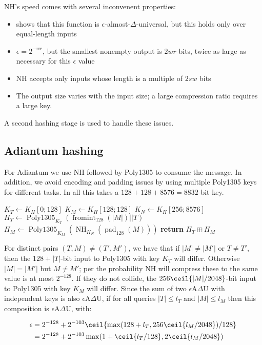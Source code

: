 \documentclass[journal=tosc,preprint,floatrow,submission]{iacrtrans}
\DeclareMathOperator{\Polydjb}{Poly1305}
\DeclareMathOperator{\NH}{NH}
\DeclareMathOperator{\fromint}{fromint}
\DeclareMathOperator{\pad}{pad}
\begin{document}
NH's speed comes with several inconvenent properties:
\begin{itemize}
    \item \cite{nh} shows that this function is $\epsilon$-almost-$\Delta$-universal, but this
        holds only over equal-length inputs
    \item $\epsilon = 2^{-wr}$, but the smallest nonempty output is $2wr$ bits, twice as large
        as necessary for this $\epsilon$ value
    \item NH accepts only inputs whose length is a multiple of $2sw$ bits
    \item The output size varies with the input size; a large compression ratio requires a large key.
\end{itemize}
A second hashing stage is used to handle these issues.

\subsection{Adiantum hashing}

For Adiantum we use NH followed by Poly1305 to consume the message. In addition, we avoid
encoding and padding issues by using multiple Poly1305 keys for different tasks.
In all this takes a $128 + 128 + 8576 = 8832$-bit key.

\begin{algorithmic}[0]
    \State $K_T \gets K_H[0;128]$
    \State $K_M \gets K_H[128;128]$
    \State $K_N \gets K_H[256;8576]$
    \State $H_T \gets \Polydjb_{K_T}(\fromint_{128}(|M|) || T)$
    \State $H_M \gets \Polydjb_{K_M}(\NH_{K_N}(\pad_{128}(M)))$
    \State \textbf{return} $H_T \boxplus H_M$
    \EndProcedure
\end{algorithmic}

For distinct pairs $(T,M) \neq (T', M')$, we have that if $|M| \neq |M'|$ or $T \neq T'$,
then the $128 + |T|$-bit input to Poly1305 with key $K_T$ will differ.
Otherwise $|M| = |M'|$ but $M \neq M'$;
per \cite{nh} the probability NH will compress these to the same value is at most
$2^{-128}$. If they do not collide, the $256\ceil{|M|/2048}$-bit input to Poly1305 with key $K_M$
will differ. Since the sum of two $\epsilon$A$\Delta$U with independent keys is also
$\epsilon$A$\Delta$U, if for all queries $|T| \leq l_T$ and $|M| \leq l_M$ then
this composition is  $\epsilon$A$\Delta$U, with:

\begin{align*}
\epsilon &= 2^{-128} + 2^{-103}\ceil{\max(128 + l_T, 256\ceil{l_M/2048})/128}  \\
&= 2^{-128} + 2^{-103}\max(1 + \ceil{l_T/128}, 2\ceil{l_M/2048})
\end{align*}
\end{document}
